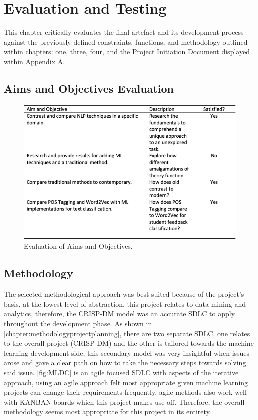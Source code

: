 \chapter{Evaluation and Testing}

This chapter critically evaluates the final artefact and its development process against the previously defined constraints, functions, and methodology outlined within chapters: one, three, four, and the Project Initiation Document displayed within Appendix A.

\section{Aims and Objectives Evaluation}

\begin{figure}[H]
    \centering
    \includegraphics[width=\textwidth]{figures/chapter-7/AimsAndObjectives.png}
    \caption[Evaluation of Aims and Objectives]{Evaluation of Aims and Objectives.
    \label{fig:aimsandobjectives}}
\end{figure}

\section{Methodology}

The selected methodological approach was best suited because of the project's basis, at the lowest level of abstraction, this project relates to data-mining and analytics, therefore, the CRISP-DM model was an accurate SDLC to apply throughout the development phase. As shown in \autoref{chapter:methodologyprojectplanning}, there are two separate SDLC, one relates to the overall project (CRISP-DM) and the other is tailored towards the machine learning development side, this secondary model was very insightful when issues arose and gave a clear path on how to take the necessary steps towards solving said issue. \autoref{fig:MLDC} is an agile focused SDLC with aspects of the iterative approach, using an agile approach felt most appropriate given machine learning projects can change their requirements frequently, agile methods also work well with KANBAN boards which this project makes use off. Therefore, the overall methodology seems most appropriate for this project in its entirety.


